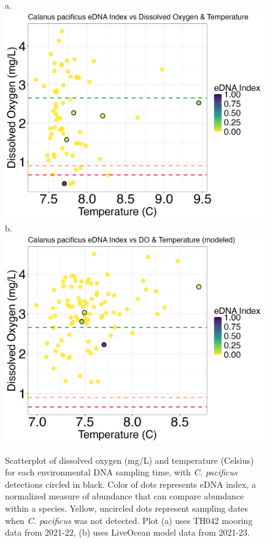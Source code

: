 \documentclass[12pt,twoside]{reedthesis}
\begin{document}
{	%
	
	\begin{figure}[!h]
		\begin{center}
			a. \includegraphics[scale=0.3]{Cpacificus_Scatter_noOut}
			b. \includegraphics[scale=0.3]{Cpacificus_Scatter_AllYr_mod_noOut}
			\caption[\textit{C. pacificus} scatterplot]{\footnotesize{Scatterplot of dissolved oxygen (mg/L) and temperature (Celsius) for each environmental DNA sampling time, with \textit{C. pacificus} detections circled in black. Color of dots represents eDNA index, a normalized measure of abundance that can compare abundance within a species. Yellow, uncircled dots represent sampling dates when \textit{C. pacificus} was not detected. Plot (a) uses TH042 mooring data from 2021-22, (b) uses LiveOcean model data from 2021-23.}} %
			\label{CpacificusScatter}
		\end{center}
	\end{figure} 
	
}
\end{document}
